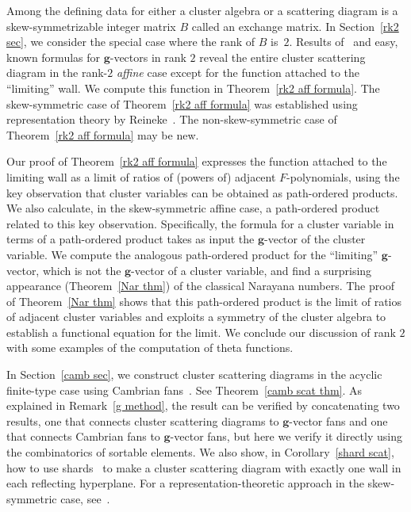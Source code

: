 \documentclass[ALCO,ThmDefs,Unicode,epreuves]{cedram}
\newcommand{\g}{\mathbf{g}}
\begin{document}

Among the defining data for either a cluster algebra or a scattering diagram is a skew-symmetrizable integer matrix $B$ called an exchange matrix. 
In Section~\ref{rk2 sec}, we consider the special case where the rank of $B$ is~$2$.
Results of~\cite{GHKK} and easy, known formulas for $\g$-vectors in rank $2$ reveal the entire cluster scattering diagram in the rank-$2$ \emph{affine} case except for the function attached to the ``limiting'' wall.
We compute this function in Theorem~\ref{rk2 aff formula}.
The skew-symmetric case of Theorem~\ref{rk2 aff formula} was established using representation theory by Reineke~\cite[Section~6]{Reineke2}.
The non-skew-symmetric case of Theorem~\ref{rk2 aff formula} may be new.

Our proof of Theorem~\ref{rk2 aff formula} expresses the function attached to the limiting wall as a limit of ratios of (powers of) adjacent $F$-polynomials, using the key observation that cluster variables can be obtained as path-ordered products.
We also calculate, in the skew-symmetric affine case, a path-ordered product related to this key observation.
Specifically, the formula for a cluster variable in terms of a path-ordered product takes as input the $\g$-vector of the cluster variable.
We compute the analogous path-ordered product for the ``limiting'' $\g$-vector, which is not the $\g$-vector of a cluster variable, and find a surprising appearance (Theorem~\ref{Nar thm}) of the classical Narayana numbers.
The proof of Theorem~\ref{Nar thm} shows that this path-ordered product is the limit of ratios of adjacent cluster variables and exploits a symmetry of the cluster algebra to establish a functional equation for the limit.
We conclude our discussion of rank $2$ with some examples of the computation of theta functions.

In Section~\ref{camb sec}, we construct cluster scattering diagrams in the acyclic finite-type case using Cambrian fans~\cite{camb_fan}.
See Theorem~\ref{camb scat thm}.
As explained in Remark~\ref{g method}, the result can be verified by concatenating two results, one that connects cluster scattering diagrams to $\g$-vector fans and one that connects Cambrian fans to $\g$-vector fans, but here we verify it directly using the combinatorics of sortable elements.
We also show, in Corollary~\ref{shard scat}, how to use shards~\cite{shardint} to make a cluster scattering diagram with exactly one wall in each reflecting hyperplane.
For a representation-theoretic approach in the skew-symmetric case, see~\cite[Example~10.3]{GHKK}.
\end{document}
